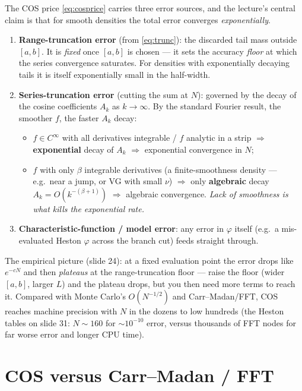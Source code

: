 \documentclass[11pt]{article}
\newcommand{\ch}{\varphi}
\begin{document}
The COS price \eqref{eq:cosprice} carries three error sources, and the lecture's central claim is that for
smooth densities the total error converges \emph{exponentially}.
\begin{enumerate}[leftmargin=*]
  \item \textbf{Range-truncation error} (from \eqref{eq:trunc}): the discarded tail mass outside $[a,b]$. It is
  \emph{fixed} once $[a,b]$ is chosen --- it sets the accuracy \emph{floor} at which the series convergence
  saturates. For densities with exponentially decaying tails it is itself exponentially small in the half-width.
  \item \textbf{Series-truncation error} (cutting the sum at $N$): governed by the decay of the cosine
  coefficients $A_k$ as $k\to\infty$. By the standard Fourier result, the smoother $f$, the faster $A_k$ decay:
  \begin{itemize}
    \item $f\in C^\infty$ with all derivatives integrable / $f$ analytic in a strip $\Rightarrow$
    \textbf{exponential} decay of $A_k$ $\Rightarrow$ exponential convergence in $N$;
    \item $f$ with only $\beta$ integrable derivatives (a finite-smoothness density --- e.g.\ near a jump, or
    VG with small $\nu$) $\Rightarrow$ only \textbf{algebraic} decay $A_k=O(k^{-(\beta+1)})$ $\Rightarrow$
    algebraic convergence. \emph{Lack of smoothness is what kills the exponential rate.}
  \end{itemize}
  \item \textbf{Characteristic-function / model error}: any error in $\ch$ itself (e.g.\ a mis-evaluated
  Heston $\ch$ across the branch cut) feeds straight through.
\end{enumerate}
The empirical picture (slide 24): at a fixed evaluation point the error drops like $e^{-cN}$ and then
\emph{plateaus} at the range-truncation floor --- raise the floor (wider $[a,b]$, larger $L$) and the plateau
drops, but you then need more terms to reach it. Compared with Monte Carlo's $O(N^{-1/2})$ and Carr--Madan/FFT,
COS reaches machine precision with $N$ in the dozens to low hundreds (the Heston tables on slide 31:
$N\!\sim\!160$ for $\sim\!10^{-10}$ error, versus thousands of FFT nodes for far worse error and longer CPU
time).

\section{COS versus Carr--Madan / FFT}\label{sec:vs}
\end{document}
